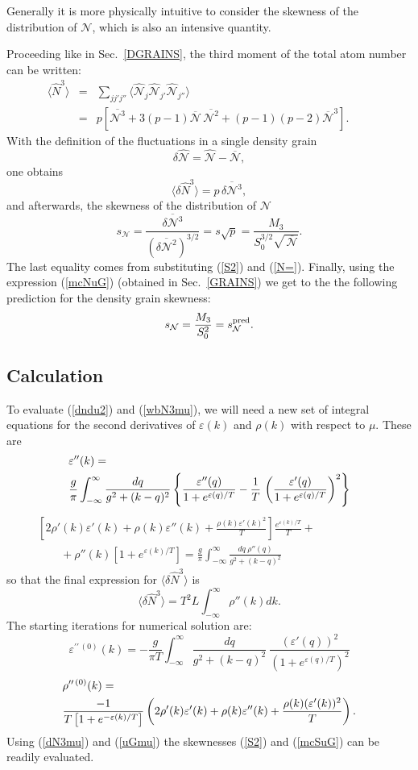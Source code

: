 \documentclass[aps,twocolumn,pra,superscriptaddress,nofootinbib,amsmath,amssymb,floats,floatfix,english]{revtex4-1}
\newcommand{\op}[1]{\widehat{#1}}
\newcommand{\mc}[1]{{\mathcal{#1}}}
\newcommand{\wb}[1]{{\overline{#1}}}
\newcommand{\nonu}{\nonumber}
\newcommand{\eqn}[1]{(\ref{#1})}
\renewcommand{\eq}[2]{\begin{equation}\label{#1}#2\end{equation}}
\newcommand{\eqa}[2]{\begin{eqnarray}#2\label{#1}\end{eqnarray}}
\newcommand{\ve}{\varepsilon}
\begin{document}
Generally it is more physically intuitive to consider the skewness of the distribution of $\mc{N}$, which is also an intensive quantity.

Proceeding like in Sec.~\ref{DGRAINS},
the 
third moment of the total atom number can be written:
\eqa{N3mc}{
\langle \op{N}^3\rangle  &=& \sum_{jj'j''}\langle\op{\mc{N}}_j\op{\mc{N}}_{j'}\op{\mc{N}}_{j''}\rangle \nonu\\
&=& p \left[\wb{\mc{N}^3} + 3(p-1)\wb{\mc{N}}\,\wb{\mc{N}^2} + (p-1)(p-2)\wb{\mc{N}}^3\right].\qquad
}
With the definition of the fluctuations in a single density grain  
\eq{delmcN}{
\delta\op{\mc{N}} = \op{\mc{N}} - \wb{\mc{N}},
}
one obtains
\eq{N3mc2}{
\langle\delta\op{N}^3\rangle = p\,\wb{\delta\mc{N}^3},
}
and afterwards, the skewness of the distribution of $\mc{N}$
\eq{mcS}{
s_{\mc{N}} = \frac{\wb{\delta\mc{N}^3}}{(\wb{\delta\mc{N}^2})^{3/2}} = s\sqrt{p} 	
= \frac{M_3}{S_0^{3/2}\sqrt{\,\wb{\mc{N}}}}. 
}
The last equality comes from substituting \eqn{S2} and \eqn{N=}.
Finally, using the expression \eqn{mcNuG}  (obtained in Sec.~\ref{GRAINS}) 
we get to the the following prediction for the density grain skewness:
\eq{mcSuG}{
s_{\mc{N}} = \frac{M_3}{S_0^2} = s_{\mc{N}}^{\rm pred}.
}


\subsection{Calculation}
\label{CALC3}
To evaluate \eqn{dndu2} and \eqn{wbN3mu}, we will need a new set of integral equations for the second derivatives of $\ve(k)$ and $\rho(k)$ with respect to $\mu$. These are 
\eqa{ddek-ieq}{
\lefteqn{\ve''(k) =}&\qquad\\
& \dfrac{g}{\pi} \displaystyle\int_{-\infty}^{\infty} \dfrac{dq}{g^2+(k-q)^2}
\left\{ 
\dfrac{\ve''(q)}{1+e^{\ve(q)/T}} -\dfrac{1}{T}\,\left(\dfrac{\ve'(q)}{1+e^{\ve(q)/T}}\right)^2
\right\}\nonu
}
\eqa{ddrhok-ieq}{
\left[ 2\rho'(k)\ve'(k) + \rho(k)\ve''(k) + \frac{\rho(k)\ve'(k)^2}{T}\right] \frac{e^{\ve(k)/T}}{T}+\qquad&	\nonu\\
\qquad+ \rho''(k)\left[1+e^{\ve(k)/T}\right] 
= \frac{g}{\pi} \int_{-\infty}^{\infty} \frac{dq\ \rho''(q)}{g^2+(k-q)^2}&\qquad\quad
}
so that the final expression for $\langle\delta \op{N}^3\rangle$ is 
\eq{dN3mu}{
\langle\delta \op{N}^3\rangle = T^2 L \int_{-\infty}^{\infty} \rho''(k) dk.
}
The starting iterations for numerical solution are:
\eq{dditer0}{
\ve^{\prime\prime\,(0)}(k) = -\frac{g}{\pi T} \int_{-\infty}^{\infty} \frac{dq}{g^2+(k-q)^2}\ \frac{(\ve'(q))^2}{\left(1+e^{\ve(q)/T}\right)^2}
}
\eqa{dditer0-rho}{
\lefteqn{\rho^{\prime\prime\,(0)}(k) =}&\\
& \dfrac{-1}{T\left[1+e^{-\ve(k)/T}\right]}   \left( 2\rho'(k)\ve'(k) + \rho(k)\ve''(k) + \dfrac{\rho(k)(\ve'(k))^2}{T}\right).\nonu
}
Using \eqn{dN3mu} and \eqn{uGmu} the skewnesses \eqn{S2} and \eqn{mcSuG} can be readily evaluated.
\end{document}
